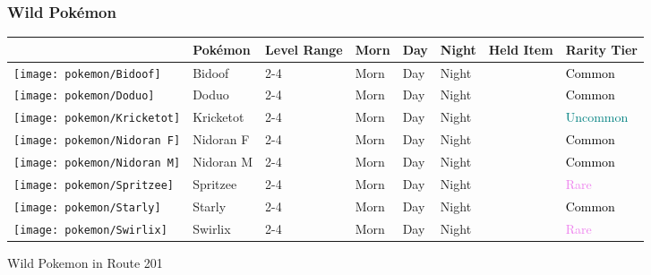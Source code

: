 \subsubsection{Wild Pokémon}%
\label{ssubsec:WildPokmon}%
\begin{longtable}{||l l l l l l l l||}%
\hline%
&Pokémon&Level Range&Morn&Day&Night&Held Item&Rarity Tier\\%
\hline%
\endhead%
\hline%
\texttt{[image: pokemon/Bidoof]}&Bidoof&2{-}4&Morn&Day&Night&&\textcolor{black}{%
Common%
}\\%
\hline%
\texttt{[image: pokemon/Doduo]}&Doduo&2{-}4&Morn&Day&Night&&\textcolor{black}{%
Common%
}\\%
\hline%
\texttt{[image: pokemon/Kricketot]}&Kricketot&2{-}4&Morn&Day&Night&&\textcolor{teal}{%
Uncommon%
}\\%
\hline%
\texttt{[image: pokemon/Nidoran F]}&Nidoran F&2{-}4&Morn&Day&Night&&\textcolor{black}{%
Common%
}\\%
\hline%
\texttt{[image: pokemon/Nidoran M]}&Nidoran M&2{-}4&Morn&Day&Night&&\textcolor{black}{%
Common%
}\\%
\hline%
\texttt{[image: pokemon/Spritzee]}&Spritzee&2{-}4&Morn&Day&Night&&\textcolor{violet}{%
Rare%
}\\%
\hline%
\texttt{[image: pokemon/Starly]}&Starly&2{-}4&Morn&Day&Night&&\textcolor{black}{%
Common%
}\\%
\hline%
\texttt{[image: pokemon/Swirlix]}&Swirlix&2{-}4&Morn&Day&Night&&\textcolor{violet}{%
Rare%
}\\%
\hline%
\end{longtable}%
\caption{Wild Pokemon in Route 201}